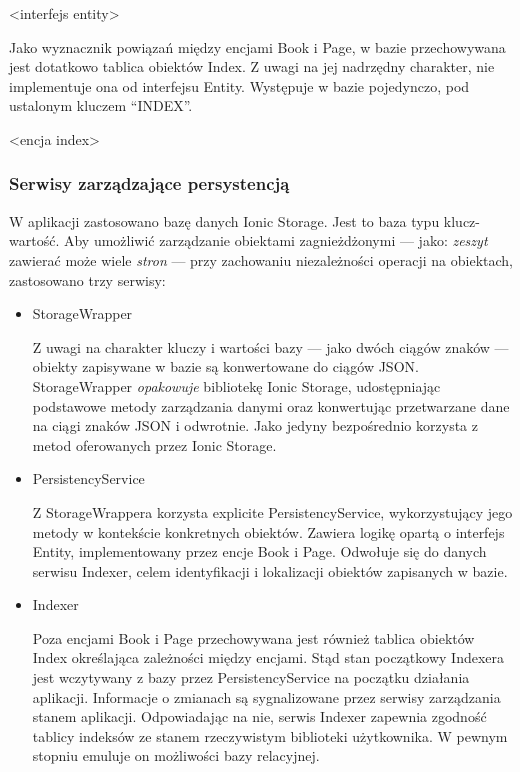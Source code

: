<interfejs entity>

Jako wyznacznik powiązań między encjami Book i Page, w bazie przechowywana jest dotatkowo tablica obiektów Index.
Z uwagi na jej nadrzędny charakter, nie implementuje ona od interfejsu Entity. Występuje w bazie pojedynczo, pod ustalonym
kluczem \enquote{INDEX}.

<encja index>

\subsubsection{Serwisy zarządzające persystencją}
W aplikacji zastosowano bazę danych Ionic Storage. Jest to baza typu klucz-wartość. Aby umożliwić
zarządzanie obiektami zagnieżdżonymi — jako: \textit{zeszyt} zawierać może wiele \textit{stron} — przy zachowaniu
niezależności operacji na obiektach, zastosowano trzy serwisy:
\begin{itemize}
	\item StorageWrapper

	      Z uwagi na charakter kluczy i wartości bazy — jako dwóch ciągów znaków — obiekty zapisywane w bazie są
	      konwertowane do ciągów JSON. StorageWrapper \textit{opakowuje} bibliotekę Ionic Storage, udostępniając podstawowe
	      metody zarządzania danymi oraz konwertując przetwarzane dane na ciągi znaków JSON i odwrotnie.
	      Jako jedyny bezpośrednio korzysta z metod oferowanych przez Ionic Storage.
	\item PersistencyService

	      Z StorageWrappera korzysta explicite PersistencyService, wykorzystujący jego metody w kontekście konkretnych obiektów.
	      Zawiera logikę opartą o interfejs Entity, implementowany przez encje Book i Page. Odwołuje się do danych
	      serwisu Indexer, celem identyfikacji i lokalizacji obiektów zapisanych w bazie.
	\item Indexer

	      Poza encjami Book i Page przechowywana jest również tablica obiektów Index określająca
	      zależności między encjami. Stąd stan początkowy Indexera jest wczytywany z bazy przez PersistencyService
	      na początku działania aplikacji.
	      Informacje o zmianach są sygnalizowane przez serwisy zarządzania stanem aplikacji.
	      Odpowiadając na nie, serwis Indexer zapewnia zgodność tablicy indeksów ze stanem rzeczywistym
	      biblioteki użytkownika. W pewnym stopniu emuluje on możliwości bazy relacyjnej.
\end{itemize}

